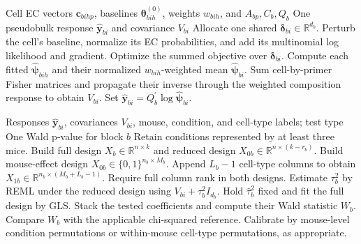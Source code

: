 \documentclass[11pt]{article}
\begin{document}
\begin{algorithm}[H]
\caption{Fit a cell-resolved pseudobulk path composition}
\label{alg:cell-resolved}
\begin{algorithmic}[1]
\Require Cell EC vectors \(\bm c_{bihp}\), baselines \(\bm\theta_{bih}^{(0)}\), weights \(w_{bih}\), and \(A_{bp},C_b,Q_b\)
\Ensure One pseudobulk response \(\widehat{\bm y}_{bi}\) and covariance \(V_{bi}\)
\State Allocate one shared \(\bm\delta_{bi}\in\mathbb R^{d_b}\).
  \State Perturb the cell's baseline, normalize its EC probabilities, and add its multinomial log likelihood and gradient.
\EndFor
\State Optimize the summed objective over \(\bm\delta_{bi}\).
\State Compute each fitted \(\widehat{\bm\psi}_{bih}\) and their normalized \(w_{bih}\)-weighted mean \(\widehat{\bm\psi}_{bi}\).
\State Sum cell-by-primer Fisher matrices and propagate their inverse through the weighted composition response to obtain \(V_{bi}\).
\State Set \(\widehat{\bm y}_{bi}=Q_b^\prime\log \widehat{\bm\psi}_{bi}\).
\end{algorithmic}
\end{algorithm}

\begin{algorithm}[H]
\caption{Gaussian condition or paired cell-type test}
\label{alg:gaussian}
\begin{algorithmic}[1]
\Require Responses \(\widehat{\bm y}_{bi}\), covariances \(V_{bi}\), mouse, condition, and cell-type labels; test type
\Ensure One Wald p-value for block \(b\)
  \State Retain conditions represented by at least three mice.
  \State Build full design \(X_b\in\mathbb R^{n\times k}\) and reduced design \(X_{0b}\in\mathbb R^{n\times(k-r_b)}\).
\Else
  \State Build mouse-effect design \(X_{0b}\in\{0,1\}^{n_b\times M_b}\).
  \State Append \(L_b-1\) cell-type columns to obtain \(X_{1b}\in\mathbb R^{n_b\times(M_b+L_b-1)}\).
\EndIf
\State Require full column rank in both designs.
\State Estimate \(\tau_b^2\) by REML under the reduced design using \(V_{bi}+\tau_b^2I_{d_b}\).
\State Hold \(\widehat\tau_b^2\) fixed and fit the full design by GLS.
\State Stack the tested coefficients and compute their Wald statistic \(W_b\).
\State Compare \(W_b\) with the applicable chi-squared reference.
\State Calibrate by mouse-level condition permutations or within-mouse cell-type permutations, as appropriate.
\end{algorithmic}
\end{algorithm}
\end{document}
